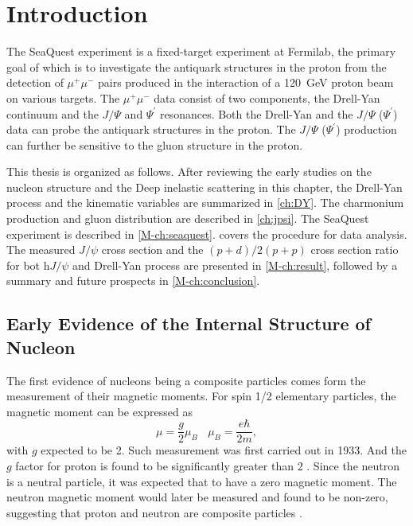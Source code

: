 \documentclass[../main.tex]{subfiles}
\begin{document}
\ifSubfilesClassLoaded{\mainmatter}{}

\chapter{Introduction}
\label{ch:intro}
The SeaQuest experiment is a fixed-target experiment at Fermilab,
the primary goal of which is to investigate the antiquark structures
in the proton from the detection of $\mu^+\mu^-$ pairs produced in 
the interaction of a \SI{120}{\GeV} proton beam on various targets. 
The $\mu^+\mu^-$ data consist of two components, the Drell-Yan continuum
and the  $J/\Psi$ and $\Psi^\prime$ resonances. 
Both the Drell-Yan and the $J/\Psi$ ($\Psi^\prime$) data can probe the antiquark structures in the proton. 
The $J/\Psi$ ($\Psi^\prime$) production can further be sensitive to the gluon structure in the proton. 

This thesis is organized as follows. After reviewing the early studies
on the nucleon structure and the Deep inelastic scattering in this chapter,
the Drell-Yan process and the kinematic variables are summarized in
\cref{ch:DY}. The charmonium production and gluon distribution are described
in \cref{ch:jpsi}. The SeaQuest experiment is described in \cref{M-ch:seaquest}.
 covers the procedure for data analysis. The measured $J/\psi$
cross section and the $(p+d)/2(p+p)$ cross section ratio for bot h$J/\psi$ and Drell-Yan process
are presented in \cref{M-ch:result}, followed by a summary and future prospects
in \cref{M-ch:conclusion}.

\section{Early Evidence of the Internal Structure of Nucleon}
The first evidence of nucleons being a composite particles comes form the
measurement of their magnetic moments. For spin 1/2 elementary particles, the
magnetic moment can be expressed as
\begin{equation}
	\mu = \frac{g}{2}\mu_B ~~~~ \mu_B = \frac{e\hbar}{2m},
\end{equation}
with $g$ expected to be \num{2}. Such measurement was first carried out in 1933.
And the $g$ factor for proton is found to be  significantly greater than \num{2}
\cite{frisch1933}. Since the neutron is a neutral particle, it was expected that
to have a zero magnetic moment. The neutron magnetic moment would later be
measured and found to be non-zero, suggesting that proton and neutron are
composite particles \cite{rabi1934a}.
\end{document}
